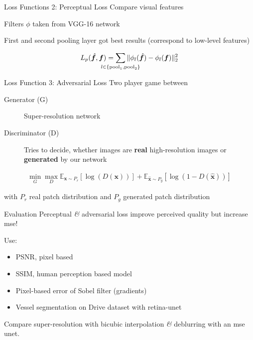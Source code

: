 \documentclass{beamer}
\newcommand{\img}{\bm{f}} %
\begin{document}
\begin{frame}{Loss Functions 2: Perceptual Loss}
  Compare visual features

  Filters $\phi$ taken from VGG-16 network

  First and second pooling layer got best results (correspond to low-level features)
 
\begin{equation}
  \label{eq:perceptual-loss}
  L_p(\hat{\img}, \img) = \sum_{\mathclap{l \in \{ \text{pool}_1, \text{pool}_2 \}}} \Vert \phi_l( \hat{\img} ) - \phi_l (\img) \Vert_2^2
\end{equation}
\end{frame}

\begin{frame}{Loss Function 3: Adversarial Loss}
  Two player game between
  \begin{description}
  \item[Generator (G)] Super-resolution network
  \item[Discriminator (D)] Tries to decide, whether images are \textbf{real} high-resolution images or \textbf{generated} by our network
  \end{description}

\begin{align}
 \min_G \max_D \mathbb{E}_{\bm{x} \sim P_r} \left[ \log (D({\bm{x}})) \right] +
  \mathbb{E}_{\hat{\bm{x}} \sim P_g} \left[  \log (1 - D(\hat{\bm{x}})) \right]
\end{align}

with $P_r$ real patch distribution and $P_g$ generated patch distribution
\end{frame}

\begin{frame}{Evaluation}
  Perceptual \textit{\&} adversarial loss improve perceived quality but increase mse!

  Use:
  \begin{itemize}
  \item PSNR, pixel based
  \item SSIM, human perception based model
  \item Pixel-based error of Sobel filter (gradients)
  \item Vessel segmentation on Drive dataset with retina-unet
  \end{itemize}

  Compare super-resolution with bicubic interpolation \textit{\&} deblurring with an mse unet.
\end{frame}
\end{document}
